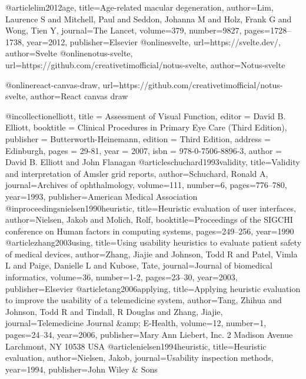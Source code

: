 @article{lim2012age,
  title={Age-related macular degeneration},
  author={Lim, Laurence S and Mitchell, Paul and Seddon, Johanna M and Holz, Frank G and Wong, Tien Y},
  journal={The Lancet},
  volume={379},
  number={9827},
  pages={1728--1738},
  year={2012},
  publisher={Elsevier}
}
@online{svelte, url={https://svelte.dev/}, author={Svelte}}
@online{notus-svelte, url={https://github.com/creativetimofficial/notus-svelte}, author={Notus-svelte}}

@online{react-canvas-draw, url={https://github.com/creativetimofficial/notus-svelte}, author={React canvas draw}}

@incollection{elliott,
title = {Assessment of Visual Function},
editor = {David B. Elliott},
booktitle = {Clinical Procedures in Primary Eye Care (Third Edition)},
publisher = {Butterworth-Heinemann},
edition = {Third Edition},
address = {Edinburgh},
pages = {29-81},
year = {2007},
isbn = {978-0-7506-8896-3},
author = {David B. Elliott and John Flanagan}
}
@article{schuchard1993validity,
  title={Validity and interpretation of Amsler grid reports},
  author={Schuchard, Ronald A},
  journal={Archives of ophthalmology},
  volume={111},
  number={6},
  pages={776--780},
  year={1993},
  publisher={American Medical Association}
}
@inproceedings{nielsen1990heuristic,
  title={Heuristic evaluation of user interfaces},
  author={Nielsen, Jakob and Molich, Rolf},
  booktitle={Proceedings of the SIGCHI conference on Human factors in computing systems},
  pages={249--256},
  year={1990}
}
@article{zhang2003using,
  title={Using usability heuristics to evaluate patient safety of medical devices},
  author={Zhang, Jiajie and Johnson, Todd R and Patel, Vimla L and Paige, Danielle L and Kubose, Tate},
  journal={Journal of biomedical informatics},
  volume={36},
  number={1-2},
  pages={23--30},
  year={2003},
  publisher={Elsevier}
}
@article{tang2006applying,
  title={Applying heuristic evaluation to improve the usability of a telemedicine system},
  author={Tang, Zhihua and Johnson, Todd R and Tindall, R Douglas and Zhang, Jiajie},
  journal={Telemedicine Journal \&amp; E-Health},
  volume={12},
  number={1},
  pages={24--34},
  year={2006},
  publisher={Mary Ann Liebert, Inc. 2 Madison Avenue Larchmont, NY 10538 USA}
}
@article{nielsen1994heuristic,
  title={Heuristic evaluation},
  author={Nielsen, Jakob},
  journal={Usability inspection methods},
  year={1994},
  publisher={John Wiley \& Sons}
}